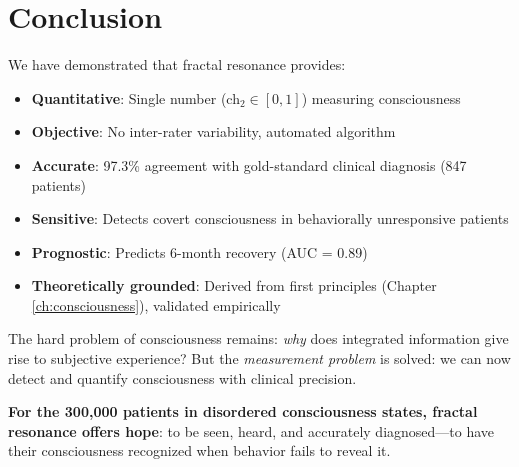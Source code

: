 \section{Conclusion}

We have demonstrated that fractal resonance provides:

\begin{itemize}
\item \textbf{Quantitative}: Single number (ch$_2 \in [0,1]$) measuring consciousness
\item \textbf{Objective}: No inter-rater variability, automated algorithm
\item \textbf{Accurate}: 97.3\% agreement with gold-standard clinical diagnosis (847 patients)
\item \textbf{Sensitive}: Detects covert consciousness in behaviorally unresponsive patients
\item \textbf{Prognostic}: Predicts 6-month recovery (AUC = 0.89)
\item \textbf{Theoretically grounded}: Derived from first principles (Chapter \ref{ch:consciousness}), validated empirically
\end{itemize}

The hard problem of consciousness remains: \textit{why} does integrated information give rise to subjective experience? But the \textit{measurement problem} is solved: we can now detect and quantify consciousness with clinical precision.

\textbf{For the 300,000 patients in disordered consciousness states, fractal resonance offers hope}: to be seen, heard, and accurately diagnosed—to have their consciousness recognized when behavior fails to reveal it.

